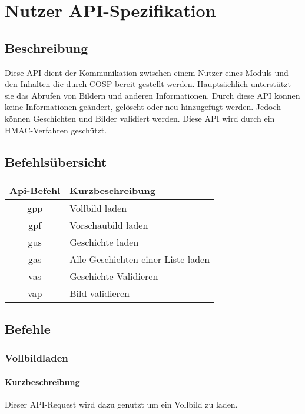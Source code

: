 \newpage
\section{Nutzer API-Spezifikation}\label{uapi}
\subsection{Beschreibung}Diese API dient der Kommunikation zwischen einem Nutzer eines Moduls und den Inhalten die durch {\glqq COSP\grqq} bereit gestellt werden. Hauptsächlich unterstützt sie das Abrufen von Bildern und anderen Informationen. Durch diese API können keine Informationen geändert, gelöscht oder neu hinzugefügt werden. Jedoch können Geschichten und Bilder validiert werden. Diese API wird durch ein HMAC-Verfahren geschützt.
\subsection{Befehlsübersicht}
\begin{longtable}[H]{|c|p{12cm}|}
		\hline
		\textbf{Api-Befehl} & \textbf{Kurzbeschreibung}              \\ \hline
		gpp                 & Vollbild laden          \\ \hline
		gpf                 & Vorschaubild laden            \\ \hline
		gus                 & Geschichte laden \\ \hline
		gas                 & Alle Geschichten einer Liste laden \\ \hline
		vas                 & Geschichte Validieren \\ \hline
		vap                 & Bild validieren \\ \hline
\end{longtable}
\newpage
\subsection{Befehle}
\subsubsection{Vollbildladen}
\paragraph{Kurzbeschreibung}Dieser API-Request wird dazu genutzt um ein Vollbild zu laden.
